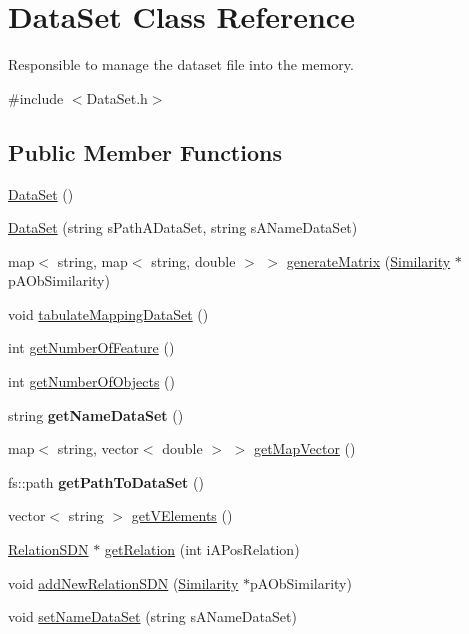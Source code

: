 \hypertarget{classDataSet}{
\section{DataSet Class Reference}
\label{classDataSet}
}


Responsible to manage the dataset file into the memory.  


{\ttfamily \#include $<$DataSet.h$>$}\subsection*{Public Member Functions}
\begin{DoxyCompactItemize}
\item 
\hyperlink{classDataSet_ac9b99505bafd5b1cccf8a361c3ac84a7}{DataSet} ()
\item 
\hyperlink{classDataSet_a46b0b094bd833ace0a8f69fc74fadf18}{DataSet} (string sPathADataSet, string sANameDataSet)
\item 
map$<$ string, map$<$ string, double $>$ $>$ \hyperlink{classDataSet_a17c8ba146ec31cd291ded2be3f8833d5}{generateMatrix} (\hyperlink{classSimilarity}{Similarity} $\ast$pAObSimilarity)
\item 
void \hyperlink{classDataSet_a8a5fa42fd383c845b2896fd7f3e4cce4}{tabulateMappingDataSet} ()
\item 
int \hyperlink{classDataSet_af747c49a69d26123a80a2da14eb40e13}{getNumberOfFeature} ()
\item 
int \hyperlink{classDataSet_ad871938d36c8988a8e921788cd0019f7}{getNumberOfObjects} ()
\item 
\hypertarget{classDataSet_a83456254b8ff38c9711d2b50383aa48e}{
string {\bfseries getNameDataSet} ()}
\label{classDataSet_a83456254b8ff38c9711d2b50383aa48e}

\item 
map$<$ string, vector$<$ double $>$ $>$ \hyperlink{classDataSet_ab143b593863e69f9fb13383b2917f6f5}{getMapVector} ()
\item 
\hypertarget{classDataSet_a62ad7281541ee669a1318883eb4e9aa7}{
fs::path {\bfseries getPathToDataSet} ()}
\label{classDataSet_a62ad7281541ee669a1318883eb4e9aa7}

\item 
vector$<$ string $>$ \hyperlink{classDataSet_aaa850e86d8c43a4209cc83cf5354822f}{getVElements} ()
\item 
\hyperlink{classRelationSDN}{RelationSDN} $\ast$ \hyperlink{classDataSet_a0f0dc6d4ebc1b45cce29c2bc3bbc0a75}{getRelation} (int iAPosRelation)
\item 
void \hyperlink{classDataSet_a88e3f1f9e32bd459356869c3f13401fc}{addNewRelationSDN} (\hyperlink{classSimilarity}{Similarity} $\ast$pAObSimilarity)
\item 
void \hyperlink{classDataSet_a13b30783d97d4ea7469988979afe457f}{setNameDataSet} (string sANameDataSet)
\end{DoxyCompactItemize}
